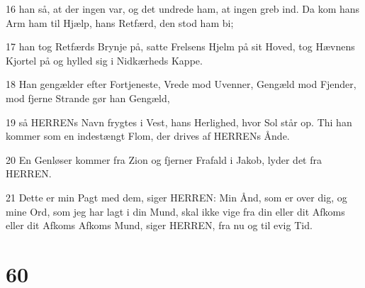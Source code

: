 \par 16 han så, at der ingen var, og det undrede ham, at ingen greb ind. Da kom hans Arm ham til Hjælp, hans Retfærd, den stod ham bi;
\par 17 han tog Retfærds Brynje på, satte Frelsens Hjelm på sit Hoved, tog Hævnens Kjortel på og hylled sig i Nidkærheds Kappe.
\par 18 Han gengælder efter Fortjeneste, Vrede mod Uvenner, Gengæld mod Fjender, mod fjerne Strande gør han Gengæld,
\par 19 så HERRENs Navn frygtes i Vest, hans Herlighed, hvor Sol står op. Thi han kommer som en indestængt Flom, der drives af HERRENs Ånde.
\par 20 En Genløser kommer fra Zion og fjerner Frafald i Jakob, lyder det fra HERREN.
\par 21 Dette er min Pagt med dem, siger HERREN: Min Ånd, som er over dig, og mine Ord, som jeg har lagt i din Mund, skal ikke vige fra din eller dit Afkoms eller dit Afkoms Afkoms Mund, siger HERREN, fra nu og til evig Tid.

\chapter{60}

